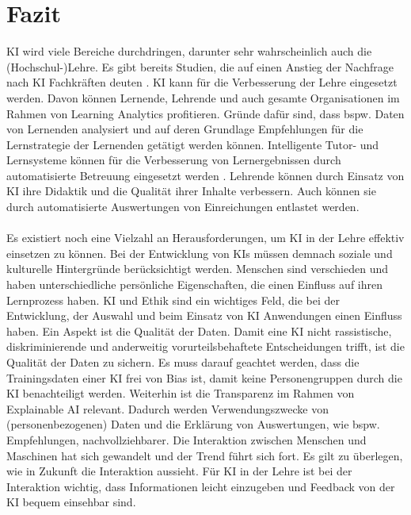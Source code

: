 \chapter{Fazit}
KI wird viele Bereiche durchdringen, darunter sehr wahrscheinlich auch die (Hochschul-)Lehre.
Es gibt bereits Studien, die auf einen Anstieg der Nachfrage nach KI Fachkräften deuten \cite[S. 26]{Witt.2020}.
KI kann für die Verbesserung der Lehre eingesetzt werden. Davon können Lernende, Lehrende und auch gesamte Organisationen im Rahmen von Learning Analytics profitieren.
Gründe dafür sind, dass bspw. Daten von Lernenden analysiert und auf deren Grundlage Empfehlungen für die Lernstrategie der Lernenden getätigt werden können. \cite[S. 14ff]{Witt.2020}
Intelligente Tutor- und Lernsysteme können für die Verbesserung von Lernergebnissen durch automatisierte Betreuung eingesetzt werden \cite[S. 24]{Witt.2020}.
Lehrende können durch Einsatz von KI ihre Didaktik und die Qualität ihrer Inhalte verbessern.
Auch können sie durch automatisierte Auswertungen von Einreichungen entlastet werden. \cite[S. 14ff]{Witt.2020}
\\ \noindent
\\ \noindent
Es existiert noch eine Vielzahl an Herausforderungen, um KI in der Lehre effektiv einsetzen zu können.
Bei der Entwicklung von KIs müssen demnach soziale und kulturelle Hintergründe berücksichtigt werden.
Menschen sind verschieden und haben unterschiedliche persönliche Eigenschaften, die einen Einfluss auf ihren Lernprozess haben.
\cite[S. 9ff]{Witt.2020} KI und Ethik sind ein wichtiges Feld, die bei der Entwicklung, der Auswahl und beim Einsatz von KI Anwendungen einen Einfluss haben.
Ein Aspekt ist die Qualität der Daten. Damit eine KI nicht rassistische, diskriminierende und anderweitig vorurteilsbehaftete Entscheidungen trifft, ist die Qualität der Daten zu sichern.
Es muss darauf geachtet werden, dass die Trainingsdaten einer KI frei von Bias ist, damit keine Personengruppen durch die KI benachteiligt werden. \cite[S. 39]{Witt.2020} 
Weiterhin ist die Transparenz im Rahmen von Explainable AI relevant. Dadurch werden Verwendungszwecke von (personenbezogenen) Daten und die Erklärung von Auswertungen, wie bspw. Empfehlungen, nachvollziehbarer.\cite[S.10f; S. 39ff;]{Witt.2020}
Die Interaktion zwischen Menschen und Maschinen hat sich gewandelt und der Trend führt sich fort.
Es gilt zu überlegen, wie in Zukunft die Interaktion aussieht.
Für KI in der Lehre ist bei der Interaktion wichtig, dass Informationen leicht einzugeben und Feedback von der KI bequem einsehbar sind. \cite[S. 11]{Pinkwart.2016}
